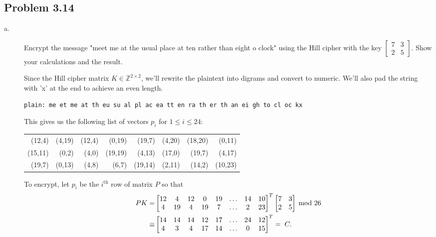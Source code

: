 \documentclass[../hw_sols.tex]{subfiles}
\begin{document}
\newpage



\subsection*{Problem 3.14}

\begin{description}

\item[a.] Encrypt the message "meet me at the usual place at ten rather than 
eight o clock" using the Hill cipher with the key 
$\begin{bmatrix} 7 & 3 \\ 2 & 5 \end{bmatrix}$. 
Show your calculations and the result.

\begin{solution}

Since the Hill cipher matrix $K \in \mathbb{Z}^{2 \times 2}$, we'll rewrite the 
plaintext into digrams and convert to numeric. \newline
We'll also pad the string with 'x' at the end to achieve an even length.
\begin{Verbatim}
plain: me et me at th eu su al pl ac ea tt en ra th er th an ei gh to cl oc kx
\end{Verbatim}

This gives us the following list of vectors $p_i$ for $1 \leq i \leq 24$:
\begin{center}
\begin{tabular}{ *{8}{ r } }
	(12,4) & (4,19) & (12,4) & (0,19) & (19,7) & (4,20) & (18,20) & (0,11) \\
	(15,11) & (0,2) & (4,0) & (19,19) & (4,13) & (17,0) & (19,7) & (4,17) \\
	(19,7) & (0,13) & (4,8) & (6,7) & (19,14) & (2,11) & (14,2) & (10,23)
\end{tabular}
\end{center}

To encrypt, let $p_i$ be the $i^{\text{th}}$ row of matrix $P$ so that
\begin{align*}
	PK =& 
	\begin{bmatrix}
		12 & 4 & 12 &  0 & 19 & \dots & 14 & 10 \\
		 4 & 19 & 4 & 19 &  7 & \dots &  2 & 23
	\end{bmatrix}^T
	\begin{bmatrix} 7 & 3 \\ 2 & 5 \end{bmatrix} \tmod{26} \\
	\equiv& 
	\begin{bmatrix}
		14 & 14 & 14 & 12 & 17 & \dots & 24 & 12 \\
		 4 &  3 &  4 & 17 & 14 & \dots &  0 & 15
	\end{bmatrix}^T 
	= \; C.
\end{align*}


\end{solution}
\end{description}
\end{document}
